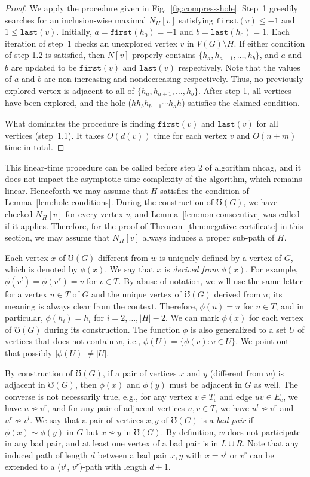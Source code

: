 \documentclass[10pt]{article}
\newcommand{\head}[1]{\ensuremath{{\mathtt{last}(#1)}}}
\newcommand{\tail}[1]{\ensuremath{{\mathtt{first}(#1)}}}
\newcommand{\stpath}[2]{($#1$, $#2$)-path}
\newcommand{\ec}{\ensuremath{E_{\text{c}}}}
\newcommand{\oc}{\ensuremath{T_{\text{c}}}}
\newcommand{\oo}{\ensuremath{T}}
\newcommand{\og}[1]{\ensuremath{\phi(#1)}}
\begin{document}
\begin{proof}
  We apply the procedure given in Fig.~\ref{fig:compress-hole}.
  Step~1 greedily searches for an inclusion-wise maximal $N_H[v]$
  satisfying $\tail{v}\le -1$ and $1 \le \head{v}$.  Initially,
  $a=\tail{h_0}=-1$ and $b=\head{h_0}=1$.  Each iteration of step~1
  checks an unexplored vertex $v$ in $V(G)\setminus H$.  If either
  condition of step 1.2 is satisfied, then $N[v]$ properly contains
  $\{h_a,h_{a+1},\dots,h_b\}$, and $a$ and $b$ are updated to be
  \tail{v} and \head{v} respectively.  Note that the values of $a$ and
  $b$ are non-increasing and nondecreasing respectively.  Thus, no
  previously explored vertex is adjacent to all of
  $\{h_a,h_{a+1},\dots,h_b\}$.  After step 1, all vertices have been
  explored, and the hole ($h h_{b} h_{b + 1} \cdots h_{a} h$)
  satisfies the claimed condition.

  What dominates the procedure is finding \tail{v} and \head{v} for
  all vertices (step~1.1).  It takes $O(d(v))$ time for each vertex
  $v$ and $O(n+m)$ time in total.
\end{proof}
This linear-time procedure can be called before step 2 of algorithm
{nhcag}, and it does not impact the asymptotic time complexity of
the algorithm, which remains linear.  Henceforth we may assume that
$H$ satisfies the condition of Lemma~\ref{lem:hole-conditions}.  During
the construction of $\mho(G)$, we have checked $N_H[v]$ for every
vertex $v$, and Lemma~\ref{lem:non-consecutive} was called if it
applies.  Therefore, for the proof of
Theorem~\ref{thm:negative-certificate} in this section, we may assume
that $N_H[v]$ always induces a proper sub-path of $H$.

Each vertex $x$ of $\mho(G)$ different from $w$ is uniquely defined by
a vertex of $G$, which is denoted by $\og{x}$.  We say that $x$ is
\emph{derived from} $\og{x}$.   For example, $\og{v^l} = \og{v^r} = v$
for $v\in \oo$.  By abuse of notation, we will use the same letter for
a vertex $u\in \overline{\oo}$ of $G$ and the unique vertex of
$\mho(G)$ derived from $u$; its meaning is always clear from the
context.  Therefore, $\og{u} = u$ for $u\in \overline{\oo}$, and in
particular, $\og{h_i} = h_i$ for $i = 2, \dots, |H|-2$.  We can mark
$\og{x}$ for each vertex of $\mho(G)$ during its construction.  The
function $\phi$ is also generalized to a set $U$ of vertices that does
not contain $w$, i.e., $\og{U} = \{\og{v}: v\in U\}$.  We point out
that possibly $|\og{U}|\ne |U|$.

By construction of $\mho(G)$, if a pair of vertices $x$ and $y$
(different from $w$) is adjacent in $\mho(G)$, then $\og{x}$ and
$\og{y}$ must be adjacent in $G$ as well.  The converse is not
necessarily true, e.g., for any vertex $v\in\oc$ and edge $u v \in
\ec$, we have $u\not\sim v^r$, and for any pair of adjacent vertices
$u,v\in \oo$, we have $u^l\not\sim v^r$ and $u^r\not\sim v^l$.  We say
that a pair of vertices $x,y$ of $\mho(G)$ is a \emph{bad pair} if
$\og{x}\sim \og{y}$ in $G$ but ${x}\not\sim {y}$ in $\mho(G)$.  By
definition, $w$ does not participate in any bad pair, and at least one
vertex of a bad pair is in $L\cup R$.  Note that any induced path of
length $d$ between a bad pair $x,y$ with $x=v^l$ or $v^r$ can be
extended to a \stpath{v^l}{v^r} with length $d+1$.
\end{document}
